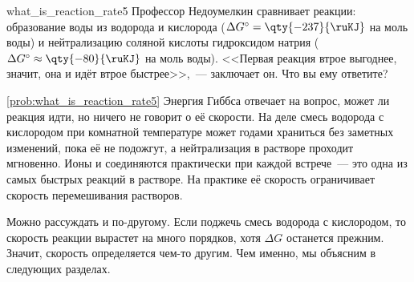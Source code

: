 \begin{problem}{}{what_is_reaction_rate5}
    Профессор Недоумелкин сравнивает реакции: образование воды из водорода и кислорода ($\Delta G^{\circ} = \qty{-237}{\ruKJ}$ на моль воды) и нейтрализацию соляной кислоты гидроксидом натрия ($\Delta G^{\circ} \approx \qty{-80}{\ruKJ}$ на моль воды). <<Первая реакция втрое выгоднее, значит, она и идёт втрое быстрее>>,~--- заключает он. Что вы ему ответите?
    \begin{sol}{\ref{prob:what_is_reaction_rate5}}
        Энергия Гиббса отвечает на вопрос, может ли реакция идти, но ничего не говорит о её скорости. На деле смесь водорода с кислородом при комнатной температуре может годами храниться без заметных изменений, пока её не подожгут, а нейтрализация в растворе проходит мгновенно. Ионы  и  соединяются практически при каждой встрече~--- это одна из самых быстрых реакций в растворе. На практике её скорость ограничивает скорость перемешивания растворов.

        Можно рассуждать и по-другому. Если поджечь смесь водорода с кислородом, то скорость реакции вырастет на много порядков, хотя $\Delta G$ останется прежним. Значит, скорость определяется чем-то другим. Чем именно, мы объясним в следующих разделах.
    \end{sol}
\end{problem}

